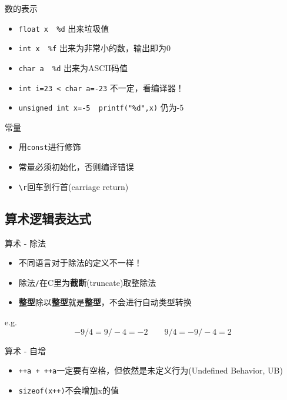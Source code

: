 \documentclass{myslide}
\begin{document}
\begin{frame}[fragile]{数的表示}
\begin{itemize}[<+->]
	\item \verb'float x  %d' 出来垃圾值
	\item \verb'int x  %f' 出来为非常小的数，输出即为0
	\item \verb'char a  %d' 出来为ASCII码值
	\item \verb'int i=23 < char a=-23' 不一定，看编译器！
	\item \verb'unsigned int x=-5  printf("%d",x)' 仍为-5
\end{itemize}
\end{frame}

\begin{frame}[fragile]{常量}
\begin{itemize}
	\item 用\verb'const'进行修饰
	\item 常量必须初始化，否则编译错误
	\item \verb'\r'回车到行首(carriage return)
\end{itemize}
\end{frame}

\subsection{算术逻辑表达式}
\begin{frame}
\subsectionpage
\end{frame}

\begin{frame}[fragile]{算术 - 除法}
\begin{itemize}
	\item 不同语言对于除法的定义不一样！
	\item 除法\verb'/'在C里为\textbf{截断}(truncate)取整除法
	\item \textbf{整型}除以\textbf{整型}就是\textbf{整型}，不会进行自动类型转换
\end{itemize}
e.g.\\
\[-9/4=9/-4=-2\qquad9/4=-9/-4=2\]
\end{frame}

\begin{frame}[fragile]{算术 - 自增}
\begin{itemize}
	\item \verb'++a + ++a'一定要有空格，但依然是未定义行为(Undefined Behavior, UB)
	\item \verb'sizeof(x++)'不会增加x的值\footnotemark[1]
\end{itemize}
\end{frame}
\end{document}
